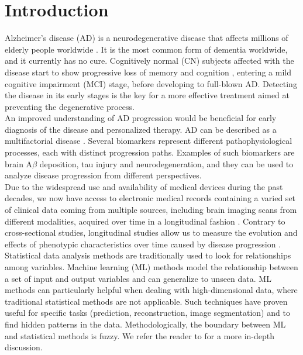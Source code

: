 \section{Introduction}

Alzheimer's disease (AD) is a neurodegenerative disease that affects millions of elderly people worldwide \cite{Ferri2005,Prince2013}. It is the most common form of dementia worldwide, and it currently has no cure. Cognitively normal (CN) subjects affected with the disease start to show progressive loss of memory and cognition \cite{Backman2004}, entering a mild cognitive impairment (MCI) stage, before developing to full-blown AD. Detecting the disease in its early stages is the key for a more effective treatment aimed at preventing the degenerative process.  \\

An improved understanding of AD progression would be beneficial for early diagnosis of the disease and personalized therapy. AD can be described as a multifactorial disease \cite{Jack2010}. Several biomarkers represent different pathophysiological processes, each with distinct progression paths. Examples of such biomarkers are brain A$\beta$ deposition, tau injury and neurodegeneration, and they can be used to analyze disease progression from different perspectives. \\ 

Due to the widespread use and availability of medical devices during the past decades, we now have access to electronic medical records containing a varied set of clinical data coming from multiple sources, including brain imaging scans from different modalities, acquired over time in a longitudinal fashion \cite{Lawrence2017}.  Contrary to cross-sectional studies, longitudinal studies allow us to measure the evolution and effects of phenotypic characteristics over time caused by disease progression \cite{Mills2014}. \\

Statistical data analysis methods are traditionally used to look for relationships among variables. Machine learning (ML) methods model the relationship between a set of input and output variables and can generalize to unseen data. ML methods can particularly helpful when dealing with high-dimensional data, where traditional statistical methods are not applicable. Such techniques have proven useful for specific tasks (prediction, reconstruction, image segmentation) and to find hidden patterns in the data. Methodologically, the boundary between ML and statistical methods is fuzzy. We refer the reader to \cite{Breiman2001,Shmueli2010} for a more in-depth discussion. \\

